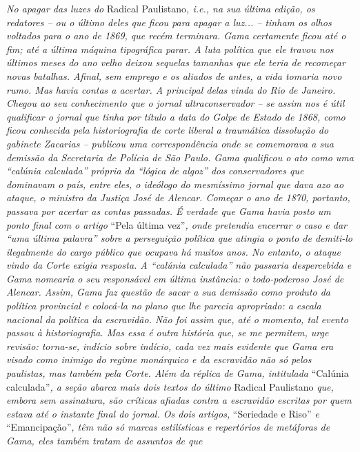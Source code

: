 \begin{argumento}
\emph{No apagar das luzes do} Radical Paulistano\emph{, i.e., na sua
última edição, os redatores -- ou o último deles que ficou para apagar a
luz... -- tinham os olhos voltados para o ano de 1869, que recém
terminara. Gama certamente ficou até o fim; até a última máquina
tipográfica parar. A luta política que ele travou nos últimos meses do
ano velho deixou sequelas tamanhas que ele teria de recomeçar novas
batalhas. Afinal, sem emprego e os aliados de antes, a vida tomaria novo
rumo. Mas havia contas a acertar. A principal delas vinda do Rio de
Janeiro. Chegou ao seu conhecimento que o jornal ultraconservador -- se
assim nos é útil qualificar o jornal que tinha por título a data do
Golpe de Estado de 1868, como ficou conhecida pela historiografia de
corte liberal a traumática dissolução do gabinete Zacarias -- publicou
uma correspondência onde se comemorava a sua demissão da Secretaria de
Polícia de São Paulo. Gama qualificou o ato como uma ``calúnia calculada''
própria da ``lógica de algoz'' dos conservadores que dominavam o país,
entre eles, o ideólogo do mesmíssimo jornal que dava azo ao ataque, o
ministro da Justiça José de Alencar. Começar o ano de 1870, portanto,
passava por acertar as contas passadas. É verdade que Gama havia posto
um ponto final com o artigo} ``Pela última vez''\emph{, onde pretendia
encerrar o caso e dar ``uma última palavra'' sobre a perseguição política
que atingia o ponto de demiti-lo ilegalmente do cargo público que
ocupava há muitos anos. No entanto, o ataque vindo da Corte exigia
resposta. A ``calúnia calculada'' não passaria despercebida e Gama
nomearia o seu responsável em última instância: o todo-poderoso José de
Alencar. Assim, Gama faz questão de sacar a sua demissão como produto da
política provincial e colocá-la no plano que lhe parecia apropriado: a
escala nacional da política da escravidão. Não foi assim que, até o
momento, tal evento passou à historiografia. Mas essa é outra história
que, se me permitem, urge revisão: torna-se, indício sobre indício, cada
vez mais evidente que Gama era visado como inimigo do regime monárquico
e da escravidão não só pelos paulistas, mas também pela Corte. Além da
réplica de Gama, intitulada} ``Calúnia calculada''\emph{, a seção abarca
mais dois textos do último} Radical Paulistano \emph{que, embora sem
assinatura, são críticas afiadas contra a escravidão escritas por quem
estava até o instante final do jornal. Os dois artigos,} ``Seriedade e
Riso'' \emph{e} ``Emancipação''\emph{, têm não só marcas estilísticas e
repertórios de metáforas de Gama, eles também tratam de assuntos de que
}
\end{argumento}
